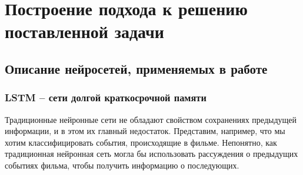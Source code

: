 \documentclass[12pt, a4paper, titlepage]{extreport}
\begin{document}
	\chapter*{Построение подхода к решению поставленной задачи}
	\section*{Описание нейросетей, применяемых в работе}
	\subsection*{LSTM – сети долгой краткосрочной памяти}
	Традиционные нейронные сети не обладают свойством сохранениях предыдущей информации, и в этом их главный недостаток. Представим, например, что мы хотим классифицировать события, происходящие в фильме. Непонятно, как традиционная нейронная сеть могла бы использовать рассуждения о предыдущих событиях фильма, чтобы получить информацию о последующих.
	
\end{document}

